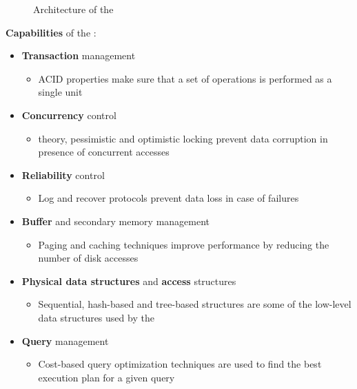 \documentclass[english]{article}
\begin{document}
\begin{figure}[htbp]
  \centering
  \bigskip
  \bigskip
  \caption{Architecture of the \dbms}
  \label{fig:architecture}
\end{figure}

\bigskip
\textbf{Capabilities} of the \dbms:

\begin{itemize}
  \item \textbf{Transaction} management
        \begin{itemize}[label=\(\rightarrow\)]
          \item ACID properties make sure that a set of operations is performed as a single unit
        \end{itemize}
  \item \textbf{Concurrency} control
        \begin{itemize}[label=\(\rightarrow\)]
          \item \CC theory, pessimistic and optimistic locking prevent data corruption in presence of concurrent accesses
        \end{itemize}
  \item \textbf{Reliability} control
        \begin{itemize}[label=\(\rightarrow\)]
          \item Log and recover protocols prevent data loss in case of failures
        \end{itemize}
  \item \textbf{Buffer} and secondary memory management
        \begin{itemize}[label=\(\rightarrow\)]
          \item Paging and caching techniques improve performance by reducing the number of disk accesses
        \end{itemize}
  \item \textbf{Physical data structures} and \textbf{access} structures
        \begin{itemize}[label=\(\rightarrow\)]
          \item Sequential, hash-based and tree-based structures are some of the low-level data structures used by the \dbms
        \end{itemize}
  \item \textbf{Query} management
        \begin{itemize}[label=\(\rightarrow\)]
          \item Cost-based query optimization techniques are used to find the best execution plan for a given query
        \end{itemize}
\end{itemize}
\end{document}
